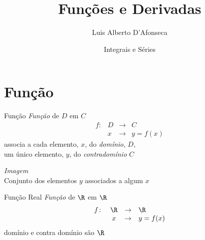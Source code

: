 
\usepackage{apresentacao}
\usepackage{mathconfig}
\usepackage{tabto}

\makeatletter
\graphicspath  {{./figs/}}
\makeatother

\title {Funções e Derivadas}
\author{\large Luis Alberto D'Afonseca}
\date  {Integrais e Séries}



\begin{frame}
    \titlepage
\end{frame}

\section{Função}

\begin{frame}{Função}
  \emph{Função} de $D$ em $C$
  \[
    \begin{array}{rccl}
      f\colon & D & \to & C \\
              & x & \to & y=f(x)
    \end{array}
  \]
  \pause
  associa a cada elemento, $x$, do \emph{domínio}, $D$, \\
  um único elemento, $y$, do \emph{contradomínio} $C$

  \vspace{\baselineskip}
  \pause
  \emph{Imagem} \\
  \pause
  Conjunto dos elementos $y$ associados a algum $x$
\end{frame}

\begin{frame}{Função Real}
  \emph{Função} de $\R$ em $\R$
  \[
  \begin{array}{rccl}
    f\colon & \R & \to & \R \\
    & x & \to & y=f(x)
  \end{array}
  \]
  domínio e contra domínio são $\R$
\end{frame}

